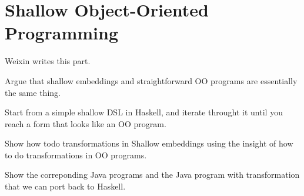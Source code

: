 \section{Shallow Object-Oriented Programming}

Weixin writes this part.

Argue that shallow embeddings and straightforward OO 
programs are essentially the same thing. 

Start from a simple shallow DSL in Haskell, 
and iterate throught it until you reach a form 
that looks like an OO program.

Show how todo transformations in Shallow embeddings
using the insight of how to do transformations in OO
programs.

Show the correponding Java programs and the Java program 
with transformation that we can port back to Haskell.

